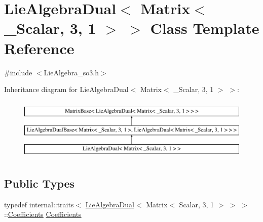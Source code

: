\hypertarget{class_lie_algebra_dual_3_01_matrix_3_01___scalar_00_013_00_011_01_4_01_4}{}\section{Lie\+Algebra\+Dual$<$ Matrix$<$ \+\_\+\+Scalar, 3, 1 $>$ $>$ Class Template Reference}
\label{class_lie_algebra_dual_3_01_matrix_3_01___scalar_00_013_00_011_01_4_01_4}


{\ttfamily \#include $<$Lie\+Algebra\+\_\+so3.\+h$>$}

Inheritance diagram for Lie\+Algebra\+Dual$<$ Matrix$<$ \+\_\+\+Scalar, 3, 1 $>$ $>$\+:\begin{figure}[H]
\begin{center}
\leavevmode
\includegraphics[height=3.000000cm]{class_lie_algebra_dual_3_01_matrix_3_01___scalar_00_013_00_011_01_4_01_4}
\end{center}
\end{figure}
\subsection*{Public Types}
\begin{DoxyCompactItemize}
\item 
typedef internal\+::traits$<$ \hyperlink{class_lie_algebra_dual}{Lie\+Algebra\+Dual}$<$ Matrix$<$ Scalar, 3, 1 $>$ $>$ $>$\+::\hyperlink{class_lie_algebra_dual_3_01_matrix_3_01___scalar_00_013_00_011_01_4_01_4_ae90a3999d66fafefffe5538cd72985ee}{Coefficients} \hyperlink{class_lie_algebra_dual_3_01_matrix_3_01___scalar_00_013_00_011_01_4_01_4_ae90a3999d66fafefffe5538cd72985ee}{Coefficients}
\end{DoxyCompactItemize}
